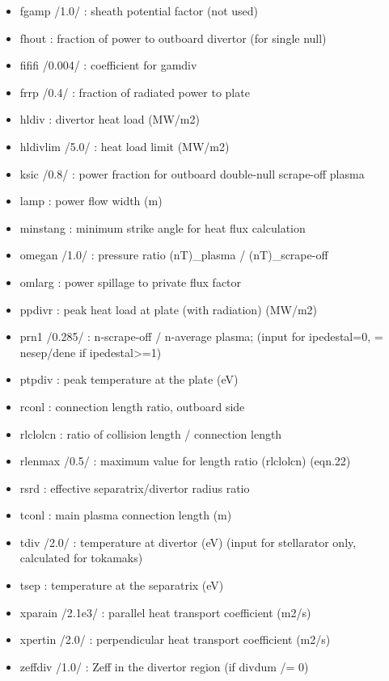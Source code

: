 \documentclass[
]{article}
\begin{document}
\begin{itemize}
\begin{itemize}
  \item
    fgamp /1.0/ : sheath potential factor (not used)
  \item
    fhout : fraction of power to outboard divertor (for single null)
  \item
    fififi /0.004/ : coefficient for gamdiv
  \item
    frrp /0.4/ : fraction of radiated power to plate
  \item
    hldiv : divertor heat load (MW/m2)
  \item
    hldivlim /5.0/ : heat load limit (MW/m2)
  \item
    ksic /0.8/ : power fraction for outboard double-null scrape-off
    plasma
  \item
    lamp : power flow width (m)
  \item
    minstang : minimum strike angle for heat flux calculation
  \item
    omegan /1.0/ : pressure ratio (nT)\_plasma / (nT)\_scrape-off
  \item
    omlarg : power spillage to private flux factor
  \item
    ppdivr : peak heat load at plate (with radiation) (MW/m2)
  \item
    prn1 /0.285/ : n-scrape-off / n-average plasma; (input for
    ipedestal=0, = nesep/dene if ipedestal\textgreater=1)
  \item
    ptpdiv : peak temperature at the plate (eV)
  \item
    rconl : connection length ratio, outboard side
  \item
    rlclolcn : ratio of collision length / connection length
  \item
    rlenmax /0.5/ : maximum value for length ratio (rlclolcn) (eqn.22)
  \item
    rsrd : effective separatrix/divertor radius ratio
  \item
    tconl : main plasma connection length (m)
  \item
    tdiv /2.0/ : temperature at divertor (eV) (input for stellarator
    only, calculated for tokamaks)
  \item
    tsep : temperature at the separatrix (eV)
  \item
    xparain /2.1e3/ : parallel heat transport coefficient (m2/s)
  \item
    xpertin /2.0/ : perpendicular heat transport coefficient (m2/s)
  \item
    zeffdiv /1.0/ : Zeff in the divertor region (if divdum /= 0)
  \end{itemize}


\end{itemize}
\end{document}
